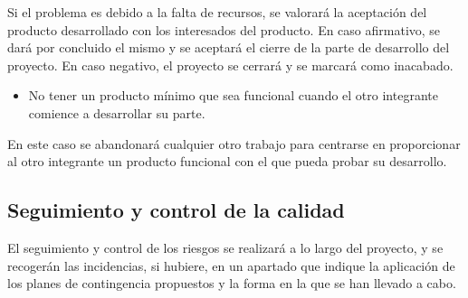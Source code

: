 Si el problema es debido a la falta de recursos, se valorará la
aceptación del producto desarrollado con los interesados del producto.
En caso afirmativo, se dará por concluido el mismo y se aceptará el
cierre de la parte de desarrollo del proyecto. En caso negativo, el
proyecto se cerrará y se marcará como inacabado.

\begin{itemize}
    \item No tener un producto mínimo que sea funcional cuando el otro
        integrante comience a desarrollar su parte.
\end{itemize}
En este caso se abandonará cualquier otro trabajo para centrarse en
proporcionar al otro integrante un producto funcional con el que pueda
probar su desarrollo.

\subsection{Seguimiento y control de la calidad}
El seguimiento y control de los riesgos se realizará a lo largo del
proyecto, y se recogerán las incidencias, si hubiere, en un apartado
que indique la aplicación de los planes de contingencia propuestos y la
forma en la que se han llevado a cabo.
